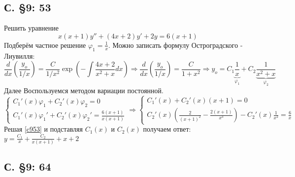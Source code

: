 \documentclass{article}
\begin{document}
\subsection{С. \S9: 53 }
Решить уравнение \begin{equation}
    x(x+1)y'' + (4x+2)y' + 2y = 6(x+1)
\end{equation}
Подберём частное решение $\varphi_1 = \frac{1}{x}$. Можно записать формулу Остроградского - Лиувилля:
\begin{equation}
    \frac{d}{dx} \left( \frac{y_o}{1/x} \right) = \frac{C}{1/x^2} \exp \left( - \int  \frac{4x+2}{x^2+x} dx\right) 
    \Rightarrow 
    \frac{d}{dx} \left( \frac{y_o}{1/x} \right) = \frac{C}{1+x^2}
    \Rightarrow
    y_o = C_1 \underbrace{\frac{1}{x}}_{\varphi_1} + C_2\underbrace{\frac{1}{x^2+x}}_{\varphi_2}        
\end{equation}
    Далее Воспользуемся методом вариации постоянной.
    \begin{equation} \label{c953}
        \begin{cases}
            C_1'(x) \varphi_1 + C_2'(x) \varphi_2 = 0 \\
            C_1'(x) \varphi_1' + C_2'(x) \varphi_2' = \frac{6(x+1)}{x (x+1)}
        \end{cases}
        \Rightarrow
        \begin{cases}
            C_1'(x) + C_2'(x) (x+1) = 0 \\
            C_2'(x) \left( \frac{2}{(x+1)^2} - \frac{2(x+1)}{x^3} \right) - C_2'(x) \frac{1}{x^2} = \frac{6}{x}
        \end{cases}
    \end{equation}
    Решая \ref{c953} и подставляя $C_1(x)$ и $C_2(x)$ получаем ответ: $y=\frac{C_1}{x}+\frac{C_2}{x(x+1)}+x+2$


\subsection{С. \S9: 64 }
\end{document}
